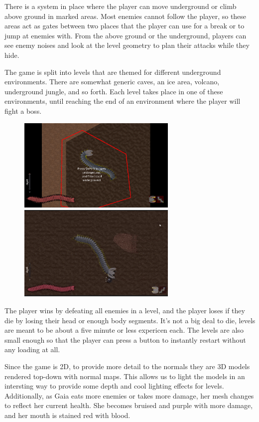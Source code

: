 \documentclass[12pt]{report}
\begin{document}
There is a system in place where the player can move underground or climb above
ground in marked areas. Most enemies cannot follow the player, so these areas
act as gates between two places that the player can use for a break or to jump
at enemies with. From the above ground or the underground, players can see 
enemy noises and look at the level geometry to plan their attacks while they
hide.

The game is split into levels that are themed for different underground environments.
There are somewhat generic caves, an ice area, volcano, underground jungle, and so
forth. Each level takes place in one of these environments, until reaching the 
end of an environment where the player will fight a boss.

\begin{figure}[h]
    \includegraphics[width=3in]{img/peek.png}
    \hfill
    \includegraphics[width=3in]{img/worm_enemy.png}
\end{figure}

The player wins by defeating all enemies in a level, and the player loses if they 
die by losing their head or enough body segments. It's not a big deal to die, levels
are meant to be about a five minute or less expericen each. The levels are also small 
enough so that the player can press a button to instantly restart without any loading
at all.

Since the game is 2D, to provide more detail to the normals they are 3D models rendered
top-down with normal maps. This allows us to light the models in an intersting way
to provide some depth and cool lighting effects for levels. Additionally, as Gaia eats
more enemies or takes more damage, her mesh changes to reflect her current health.
She becomes bruised and purple with more damage, and her mouth is stained red with blood.
\end{document}
